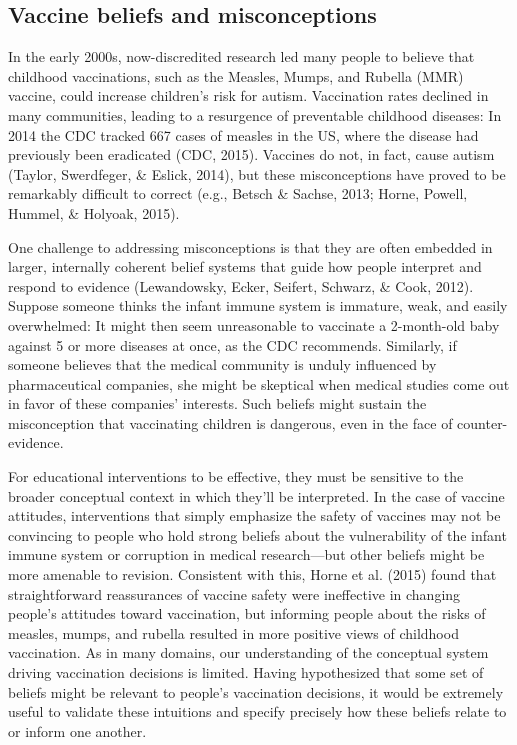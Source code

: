 \documentclass[10pt, letterpaper]{article}
\begin{document}
\subsection{Vaccine beliefs and
misconceptions}\label{vaccine-beliefs-and-misconceptions}

In the early 2000s, now-discredited research led many people to believe
that childhood vaccinations, such as the Measles, Mumps, and Rubella
(MMR) vaccine, could increase children's risk for autism. Vaccination
rates declined in many communities, leading to a resurgence of
preventable childhood diseases: In 2014 the CDC tracked 667 cases of
measles in the US, where the disease had previously been eradicated
(CDC, 2015). Vaccines do not, in fact, cause autism (Taylor, Swerdfeger,
\& Eslick, 2014), but these misconceptions have proved to be remarkably
difficult to correct (e.g., Betsch \& Sachse, 2013; Horne, Powell,
Hummel, \& Holyoak, 2015).

One challenge to addressing misconceptions is that they are often
embedded in larger, internally coherent belief systems that guide how
people interpret and respond to evidence (Lewandowsky, Ecker, Seifert,
Schwarz, \& Cook, 2012). Suppose someone thinks the infant immune system
is immature, weak, and easily overwhelmed: It might then seem
unreasonable to vaccinate a 2-month-old baby against 5 or more diseases
at once, as the CDC recommends. Similarly, if someone believes that the
medical community is unduly influenced by pharmaceutical companies, she
might be skeptical when medical studies come out in favor of these
companies' interests. Such beliefs might sustain the misconception that
vaccinating children is dangerous, even in the face of counter-evidence.

For educational interventions to be effective, they must be sensitive to
the broader conceptual context in which they'll be interpreted. In the
case of vaccine attitudes, interventions that simply emphasize the
safety of vaccines may not be convincing to people who hold strong
beliefs about the vulnerability of the infant immune system or
corruption in medical research---but other beliefs might be more
amenable to revision. Consistent with this, Horne et al. (2015) found
that straightforward reassurances of vaccine safety were ineffective in
changing people's attitudes toward vaccination, but informing people
about the risks of measles, mumps, and rubella resulted in more positive
views of childhood vaccination. As in many domains, our understanding of
the conceptual system driving vaccination decisions is limited. Having
hypothesized that some set of beliefs might be relevant to people's
vaccination decisions, it would be extremely useful to validate these
intuitions and specify precisely how these beliefs relate to or inform
one another.
\end{document}
